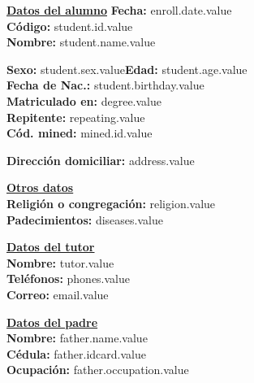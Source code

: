 \documentclass[12pt]{article}
\newcommand{\aField}[1]{#1}
\newcommand{\enrollDate}{enroll.date.value}
\newcommand{\studentName}{student.name.value}
\newcommand{\studentBirthday}{student.birthday.value}
\newcommand{\studentAge}{student.age.value}
\newcommand{\studentSex}{student.sex.value}
\newcommand{\isRepeating}{repeating.value}
\newcommand{\minedId}{mined.id.value}
\newcommand{\degree}{degree.value}
\newcommand{\address}{address.value}
\newcommand{\religion}{religion.value}
\newcommand{\diseases}{diseases.value}
\newcommand{\tutor}{tutor.value}
\newcommand{\phones}{phones.value}
\newcommand{\email}{email.value}
\newcommand{\fatherName}{father.name.value}
\newcommand{\fatherIdcard}{father.idcard.value}
\newcommand{\fatherOccupation}{father.occupation.value}
\newcommand{\studentId}{student.id.value}
\begin{document}
    \textbf{\uline{Datos del alumno}} \hfill \textbf{Fecha:} \enrollDate\\[1mm]
    \textbf{Código:} \aField{\studentId}\\
    \textbf{Nombre:} \aField{\studentName}
    \par\vspace{1mm}
    \begin{minipage}[t]{0.49\textwidth}
        \textbf{Sexo:} \aField{\studentSex}\hspace{6mm}\textbf{Edad:} \aField{\studentAge}\\
        \textbf{Fecha de Nac.:} \aField{\studentBirthday}\\
        \textbf{Matriculado en:} \aField{\degree}\\
        \textbf{Repitente:} \aField{\isRepeating}\\
        \textbf{Cód. mined:} \aField{\minedId}
    \end{minipage}
    \hfill
    \begin{minipage}[t]{0.49\textwidth}
        \textbf{Dirección domiciliar:} \aField{\address}
    \end{minipage}
    \par\vspace{4mm}
    \begin{minipage}[t]{0.49\textwidth}
        \textbf{\uline{Otros datos}}\\[1mm]
        \textbf{Religión o congregación:} \aField{\religion}\\
        \textbf{Padecimientos:} \aField{\diseases}
    \end{minipage}
    \hfill
    \begin{minipage}[t]{0.49\textwidth}
        \textbf{\uline{Datos del tutor}}\\[1mm]
        \textbf{Nombre:} \aField{\tutor}\\
        \textbf{Teléfonos:} \aField{\phones}\\
        \textbf{Correo:} \aField{\email}
    \end{minipage}
    \par\vspace{4mm}
    \begin{minipage}[t]{0.49\textwidth}
        \textbf{\uline{Datos del padre}}\\[1mm]
        \textbf{Nombre:} \aField{\fatherName}\\
        \textbf{Cédula:} \aField{\fatherIdcard}\\
        \textbf{Ocupación:} \aField{\fatherOccupation}
    \end{minipage}
\end{document}
